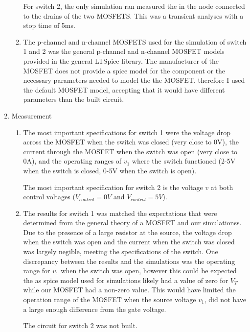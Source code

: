 \documentclass[12pt]{article}
\begin{document}
\begin{enumerate}
\begin{enumerate}
        For switch 2, the only simulation ran measured the in the node connected to the drains of the two MOSFETS. This was a transient analyses with a stop time of 5ms.
        \item %
        The p-channel and n-channel MOSFETS used for the simulation of switch 1 and 2 was the general p-channel and n-channel MOSFET models provided in the general LTSpice library. The manufacturer of the MOSFET does not provide a spice model for the component or the necessary parameters needed to model the the MOSFET, therefore I used the default MOSFET model, accepting that it would have different parameters than the built circuit.
    \end{enumerate}
    \item Measurement
    \begin{enumerate}
        \item %
        The most important specifications for switch 1 were the voltage drop across the MOSFET when the switch was closed (very close to 0V), the current through the MOSFET when the switch was open (very close to 0A), and the operating ranges of $v_1$ where the switch functioned (2-5V when the switch is closed, 0-5V when the switch is open).
        
        The most important specification for switch 2 is the voltage $v$ at both control voltages ($V_{control} = 0V$ and $V_{control} = 5V$).
        \item %
        The results for switch 1 was matched the expectations that were determined from the general theory of a MOSFET and our simulationss. Due to the presence of a large resistor at the source, the voltage drop when the switch was open and the current when the switch was closed was largely negible, meeting the specifications of the switch. One discrepancy between the results and the simulations was the operating range for $v_1$ when the switch was open, however this could be expected the as spice model used for simulations likely had a value of zero for $V_T$ while our MOSFET had a non-zero value. This would have limited the operation range of the MOSFET when the source voltage $v_1$, did not have a large enough difference from the gate voltage.

        The circuit for switch 2 was not built.
    \end{enumerate}
\end{enumerate}
\end{document}
